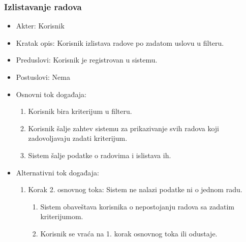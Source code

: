 \documentclass[a4paper]{article}
\begin{document}
\subsubsection{Izlistavanje radova}
\label{subsubsection:izlistavanjeradova}
\begin{itemize}
    \item Akter: Korisnik
    \item Kratak opis: Korisnik izlistava radove po zadatom uslovu u filteru.
    \item Preduslovi: Korisnik je registrovan u sistemu.
    \item Postuslovi: Nema
    \item Osnovni tok događaja:
        \begin{enumerate}
            \item Korisnik bira kriterijum u filteru.
            \item Korisnik šalje zahtev sistemu za prikazivanje svih radova koji zadovoljavaju zadati kriterijum.
            \item Sistem šalje podatke o radovima i islistava ih.
        \end{enumerate}
    \item Alternativni tok događaja:
        \begin{enumerate}
            \item Korak 2. osnovnog toka: Sistem ne nalazi podatke ni o jednom radu.
            \begin{enumerate}
                \item Sistem obaveštava korisnika o nepostojanju radova sa zadatim kriterijumom.
                \item Korisnik se vraća na 1. korak osnovnog toka ili odustaje.
            \end{enumerate}
        \end{enumerate}
\end{itemize}

\newpage
\end{document}
